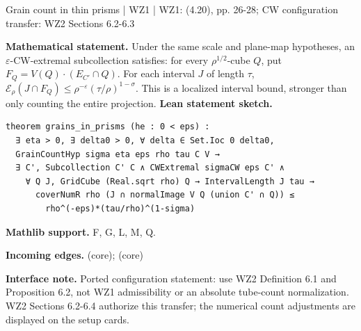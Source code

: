 \documentclass[10pt,a4paper]{article}
\newcommand{\nodecard}[1]{\hyperlink{node-#1}{\texttt{\detokenize{#1}}}}
\begin{document}
\begin{minipage}{\linewidth}
\hypertarget{node-L4_10}{}
\begin{tcolorbox}[colback=white,colframe=grainsfg,colbacktitle=grainsbg,coltitle=ink,boxrule=0.45pt,arc=1.6mm,left=3mm,right=3mm,top=2mm,bottom=2mm,title={\sffamily\bfseries WZ1 Lemma 4.10 / CW \hfill \texttt{L4\_10}}]
{\sffamily\small\color{muted}Grain count in thin prisms | WZ1 | WZ1: (4.20), pp. 26-28; CW configuration transfer: WZ2 Sections 6.2-6.3}\par
\textbf{Mathematical statement.} Under the same scale and plane-map hypotheses, an $\varepsilon$-CW-extremal subcollection satisfies:
for every $\rho^{1/2}$-cube $Q$, put $F_Q=V(Q)\cdot(E_{C'}\cap Q)$.
For each interval $J$ of length $\tau$,
$\mathcal E_\rho(J\cap F_Q)\le\rho^{-\varepsilon}(\tau/\rho)^{1-\sigma}$.
This is a localized interval bound, stronger than only counting the entire projection.
\smallskip\textbf{Lean statement sketch.}
\begin{Verbatim}[fontsize=\small,breaklines=true,breakanywhere=true,tabsize=2]
theorem grains_in_prisms (he : 0 < eps) :
  ∃ eta > 0, ∃ delta0 > 0, ∀ delta ∈ Set.Ioc 0 delta0,
  GrainCountHyp sigma eta eps rho tau C V →
  ∃ C', Subcollection C' C ∧ CWExtremal sigmaCW eps C' ∧
    ∀ Q J, GridCube (Real.sqrt rho) Q → IntervalLength J tau →
      coverNumR rho (J ∩ normalImage V Q (union C' ∩ Q)) ≤
        rho^(-eps)*(tau/rho)^(1-sigma)
\end{Verbatim}
{\footnotesize\textbf{Mathlib support.} F, G, L, M, Q.\par
\textbf{Incoming edges.} \nodecard{L4_9} (core); \nodecard{W2P6_2} (core)\par}
{\footnotesize\textbf{Interface note.}  Ported configuration statement: use WZ2 Definition 6.1 and Proposition 6.2, not WZ1 admissibility or an absolute tube-count normalization. WZ2 Sections 6.2-6.4 authorize this transfer; the numerical count adjustments are displayed on the setup cards.}
\end{tcolorbox}\end{minipage}\par\medskip
\end{document}
